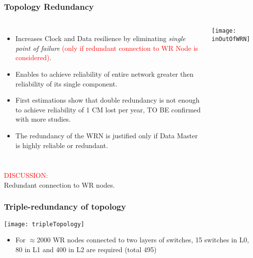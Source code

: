 \documentclass[]{beamer}
\begin{document}
\begin{frame}
  \frametitle{Topology Redundancy}   

  \begin{columns}[c]
  \column{3.8in} 

  \begin{itemize}
  \item Increases Clock and Data resilience by eliminating \textit{single point
	of failure} \textcolor{red}{(only if redundant connection to WR Node is
	considered)}.
  \item Enables to achieve reliability of entire network greater then
	reliability of its single component.
  \item First estimations show that double redundancy is not enough to achieve
	reliability of 1 CM lost per year, TO BE confirmed with more studies.
  \item The redundancy of the WRN is justified only if Data Master is
	highly reliable or redundant.
  \end{itemize}

  \column{1.2in}
  \centering
  \texttt{[image: inOutOfWRN]}

  \end{columns}
\centering
\textcolor{red}{DISCUSSION:} \\
Redundant connection to WR nodes.

\end{frame}

\begin{frame}
  \frametitle{Triple-redundancy of topology}
  \centering
  \texttt{[image: tripleTopology]}

  \begin{itemize}
  \item For $\approx$2000 WR nodes connected to two layers of switches, 
        15 switches in L0, 80 in L1 and 400 in L2 are required (total 495)
  \end{itemize}

\end{frame}
\end{document}
